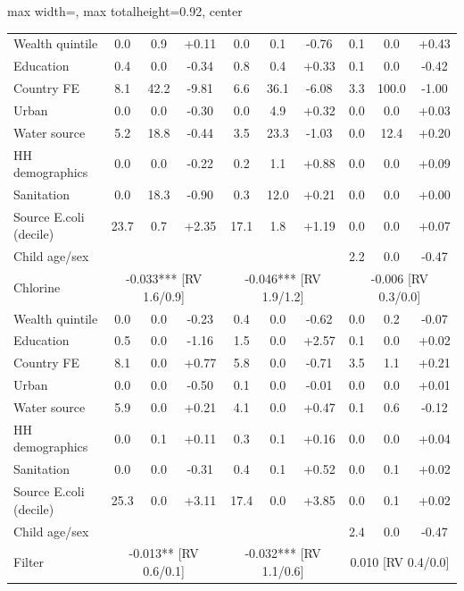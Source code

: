 \begin{landscape}
\begin{table}[htbp]
\begin{adjustbox}{max width=\linewidth, max totalheight=0.92\textheight, center}
\begin{tabular}{l|ccc|ccc|ccc}
\quad Wealth quintile & 0.0 & 0.9 & +0.11 & 0.0 & 0.1 & -0.76 & 0.1 & 0.0 & +0.43 \\
\quad Education & 0.4 & 0.0 & -0.34 & 0.8 & 0.4 & +0.33 & 0.1 & 0.0 & -0.42 \\
\quad Country FE & 8.1 & 42.2 & -9.81 & 6.6 & 36.1 & -6.08 & 3.3 & 100.0 & -1.00 \\
\quad Urban & 0.0 & 0.0 & -0.30 & 0.0 & 4.9 & +0.32 & 0.0 & 0.0 & +0.03 \\
\quad Water source & 5.2 & 18.8 & -0.44 & 3.5 & 23.3 & -1.03 & 0.0 & 12.4 & +0.20 \\
\quad HH demographics & 0.0 & 0.0 & -0.22 & 0.2 & 1.1 & +0.88 & 0.0 & 0.0 & +0.09 \\
\quad Sanitation & 0.0 & 18.3 & -0.90 & 0.3 & 12.0 & +0.21 & 0.0 & 0.0 & +0.00 \\
\quad Source E.coli (decile) & 23.7 & 0.7 & +2.35 & 17.1 & 1.8 & +1.19 & 0.0 & 0.0 & +0.07 \\
\quad Child age/sex &  &  &  &  &  &  & 2.2 & 0.0 & -0.47 \\
\midrule
Chlorine & \multicolumn{3}{c|}{-0.033*** {\scriptsize[RV 1.6/0.9]}} & \multicolumn{3}{c|}{-0.046*** {\scriptsize[RV 1.9/1.2]}} & \multicolumn{3}{c}{-0.006 {\scriptsize[RV 0.3/0.0]}} \\
\quad Wealth quintile & 0.0 & 0.0 & -0.23 & 0.4 & 0.0 & -0.62 & 0.0 & 0.2 & -0.07 \\
\quad Education & 0.5 & 0.0 & -1.16 & 1.5 & 0.0 & +2.57 & 0.1 & 0.0 & +0.02 \\
\quad Country FE & 8.1 & 0.0 & +0.77 & 5.8 & 0.0 & -0.71 & 3.5 & 1.1 & +0.21 \\
\quad Urban & 0.0 & 0.0 & -0.50 & 0.1 & 0.0 & -0.01 & 0.0 & 0.0 & +0.01 \\
\quad Water source & 5.9 & 0.0 & +0.21 & 4.1 & 0.0 & +0.47 & 0.1 & 0.6 & -0.12 \\
\quad HH demographics & 0.0 & 0.1 & +0.11 & 0.3 & 0.1 & +0.16 & 0.0 & 0.0 & +0.04 \\
\quad Sanitation & 0.0 & 0.0 & -0.31 & 0.4 & 0.1 & +0.52 & 0.0 & 0.1 & +0.02 \\
\quad Source E.coli (decile) & 25.3 & 0.0 & +3.11 & 17.4 & 0.0 & +3.85 & 0.0 & 0.1 & +0.02 \\
\quad Child age/sex &  &  &  &  &  &  & 2.4 & 0.0 & -0.47 \\
\midrule
Filter & \multicolumn{3}{c|}{-0.013** {\scriptsize[RV 0.6/0.1]}} & \multicolumn{3}{c|}{-0.032*** {\scriptsize[RV 1.1/0.6]}} & \multicolumn{3}{c}{0.010 {\scriptsize[RV 0.4/0.0]}} \\

\end{tabular}
\end{adjustbox}
\end{table}
\end{landscape}
